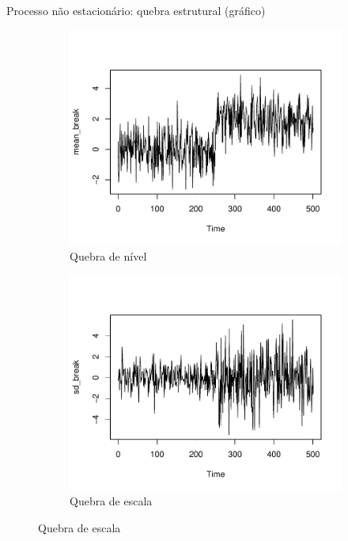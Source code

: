 \documentclass[11pt]{beamer}
\begin{document}
\begin{frame}{Processo não estacionário: quebra estrutural (gráfico)}
	\begin{figure}
	\begin{subfigure}{0.5\textwidth}
		\centering
		\includegraphics[scale=0.4]{graficos/break_mean.pdf}
		\caption{Quebra de nível}
		
	\end{subfigure}\begin{subfigure}{0.5\textwidth}
			\centering
					\includegraphics[scale=0.4]{graficos/break_sd.pdf}
		\caption{Quebra de escala}
	\end{subfigure}
	\end{figure}
\end{frame}
\end{document}
